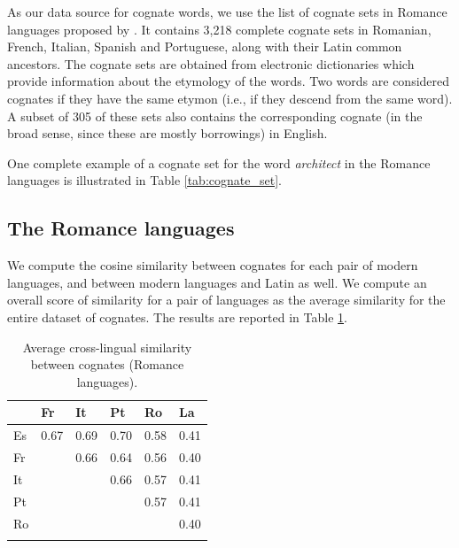 \documentclass[output=paper]{langsci/langscibook}
\begin{document}
As our data source for cognate words, we use the list of cognate sets in Romance languages proposed by \citet{cognatesuban:ciobanu_and_dinu_lrec}. It contains 3,218 complete cognate sets in Romanian, French, Italian, Spanish and Portuguese, along with their Latin common ancestors. The cognate sets are obtained from electronic dictionaries which provide information about the etymology of the words. Two words are considered cognates if they have the same etymon (i.e., if they descend from the same word). A subset of 305 of these sets also contains the corresponding cognate (in the broad sense, since these are mostly borrowings) in English.

One complete example of a cognate set for the word \textit{architect} in the Romance languages is illustrated in Table \ref{tab:cognate_set}.

\begin{table}
    \caption{An example of a cognate set: \textit{architect} in Romance languages.}
    \label{tab:cognate_set}
\end{table}

\subsection{The Romance languages}

We compute the cosine similarity between cognates for each pair of modern languages, and between modern languages and Latin as well. We compute an overall score of similarity for a pair of languages as the average similarity for the entire dataset of cognates. The results are reported in Table \ref{table:cognate_divergence}.

\begin{table}
\begin{center}
\begin{tabular}{l l l l l l}
\lsptoprule
& Fr & It & Pt & Ro & La\\
\midrule

Es & 0.67 & 0.69 & 0.70 & 0.58 & 0.41\\
Fr & & 0.66 & 0.64 & 0.56 & 0.40 \\
It & & & 0.66 & 0.57 & 0.41 \\
Pt & & & & 0.57 & 0.41\\
Ro & & & & & 0.40 \\
\lspbottomrule

\end{tabular}
\end{center}
\caption{\label{table:cognate_divergence}Average cross-lingual similarity between cognates (Romance languages).}
\end{table}
\end{document}
